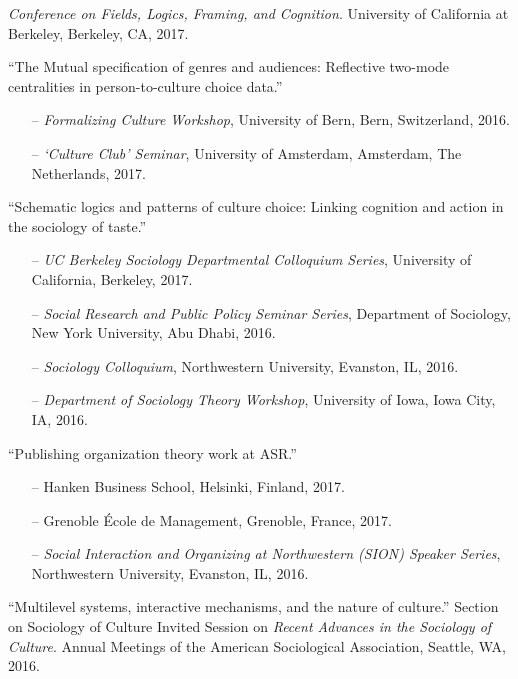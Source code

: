 \ind \emph{Conference on Fields, Logics, Framing, and Cognition}. University of California at Berkeley, Berkeley, CA, 2017.

\ind ``The Mutual specification of genres and audiences: Reflective two-mode centralities in person-to-culture choice data.'' 
\begin{itemize}[leftmargin=0.8in, topsep = 0pt]
	\setlength\itemsep{-0.55em}
	\item[--] {\em Formalizing Culture Workshop}, University of Bern, Bern, Switzerland, 2016. 
    \item[--] {\em `Culture Club' Seminar}, University of Amsterdam, Amsterdam, The Netherlands, 2017.
\end{itemize}

\ind ``Schematic logics and patterns of culture choice: Linking cognition and action in the sociology of taste.'' 
\begin{itemize}[leftmargin=0.8in, topsep = 0pt]
	\setlength\itemsep{-0.55em}
	\item[--] {\em UC Berkeley Sociology Departmental Colloquium Series}, University of California, Berkeley, 2017.
	\item[--] {\em Social Research and Public Policy Seminar Series}, Department of Sociology, New York University, Abu Dhabi, 2016. 
	\item[--] {\em Sociology Colloquium}, Northwestern University, Evanston, IL, 2016.
    \item[--] {\em Department of Sociology Theory Workshop}, University of Iowa, Iowa City, IA, 2016.
\end{itemize}

\ind ``Publishing organization theory work at ASR.'' 
\begin{itemize}[leftmargin=0.8in, topsep = 0pt]
	\setlength\itemsep{-0.55em}
	\item[--] Hanken Business School, Helsinki, Finland, 2017. 
    \item[--] Grenoble \'{E}cole de Management, Grenoble, France, 2017.
	\item[--] {\em Social Interaction and Organizing at Northwestern (SION) Speaker Series}, Northwestern University, Evanston, IL, 2016. 
\end{itemize}

\ind ``Multilevel systems, interactive mechanisms, and the nature of culture.'' Section on Sociology of Culture Invited Session on {\em Recent Advances in the Sociology of Culture}. Annual Meetings of the American Sociological Association, Seattle, WA, 2016. 

